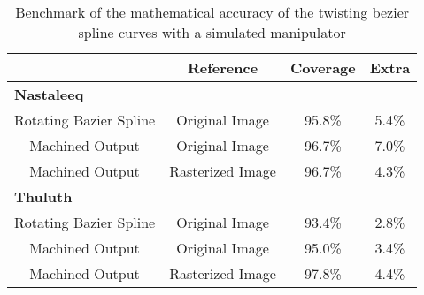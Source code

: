     \begin{table}
    \begin{center}
    \caption{Benchmark of the mathematical accuracy of the twisting bezier spline curves with a simulated manipulator}
    \label{Table:MachineDataMetrices}
    \begin{tabular}{| c | c | c | c |}
    \hline
      & \textbf{Reference} & \textbf{Coverage} & \textbf{Extra} \\
      \hline
      \multicolumn{4}{|l|}{\textbf{Nastaleeq}}\\
      \hline
      Rotating Bazier Spline & Original Image & 95.8\% & 5.4\% \\
      \hline
      Machined Output & Original Image & 96.7\% & 7.0\% \\
      \hline
      Machined Output & Rasterized Image & 96.7\% & 4.3\% \\
      \hline
      \multicolumn{4}{|l|}{\textbf{Thuluth}}\\
      \hline
      Rotating Bazier Spline & Original Image & 93.4\% & 2.8\% \\
      \hline
      Machined Output & Original Image & 95.0\% & 3.4\% \\
      \hline
      Machined Output & Rasterized Image & 97.8\% & 4.4\% \\
    \hline
    \end{tabular}
    \end{center}
    \end{table} 